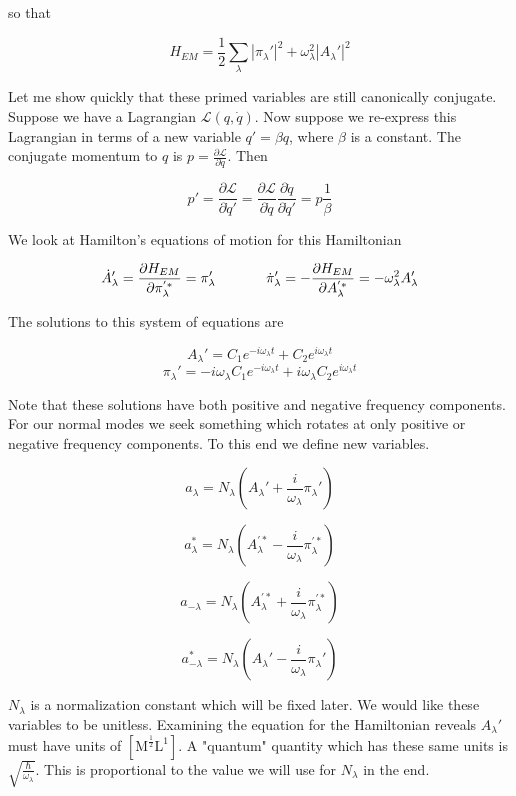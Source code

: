 \documentclass[12pt]{article}
\newcommand{\pardiv}[2][]{\frac{\partial #1}{\partial #2}}
\begin{document}
so that

\[H_{EM} = \frac{1}{2} \sum_{\lambda} |\pi_{\lambda}'|^2 +\omega_\lambda^2|A_{\lambda}'|^2 \]

Let me show quickly that these primed variables are still canonically conjugate. Suppose we have a Lagrangian $\mathcal{L}(q,\dot{q})$. Now suppose we re-express this Lagrangian in terms of a new variable $q' = \beta q$, where $\beta$ is a constant. The conjugate momentum to $q$ is $p = \pardiv[\mathcal{L}]{\dot{q}}$. Then

\[p' = \pardiv[\mathcal{L}]{\dot{q}'} = \pardiv[\mathcal{L}]{\dot{q}} \pardiv[\dot{q}]{\dot{q}'} = p \frac{1}{\beta} \]





We look at Hamilton's equations of motion for this Hamiltonian

\[\dot{A}_{\lambda}' = \pardiv[H_{EM}]{\pi_{\lambda}^{'*}} = \pi_{\lambda}' 
\hspace{.5 in}
\dot{\pi}_{\lambda}' = -\pardiv[H_{EM}]{A_{\lambda}^{'*}} = -\omega_\lambda^2 A_{\lambda}'  \]

The solutions to this system of equations are

\[A_{\lambda}' = C_1 e^{-i\omega_\lambda t} + C_2 e^{i \omega_{\lambda} t} \]
\[\pi_{\lambda}' = -i\omega_{\lambda} C_1 e^{-i\omega_{\lambda} t} +i\omega_{\lambda}C_2 e^{i\omega_{\lambda} t} \]

Note that these solutions have both positive and negative frequency components.
For our normal modes we seek something which rotates at only positive or negative frequency components.
To this end we define new variables.

\[a_{\lambda} = N_{\lambda}\left(A_\lambda' + \frac{i}{\omega_{\lambda}} \pi_{\lambda}'\right) \]

\[a_{\lambda}^* = N_{\lambda}\left(A_\lambda^{'*} - \frac{i}{\omega_{\lambda}} \pi_{\lambda}^{'*}\right) \]

\[a_{-\lambda} = N_{\lambda}\left(A_\lambda^{'*} + \frac{i}{\omega_{\lambda}} \pi_{\lambda}^{'*}\right) \]

\[a_{-\lambda}^* = N_{\lambda}\left(A_\lambda' - \frac{i}{\omega_{\lambda}} \pi_{\lambda}'\right) \]

$N_{\lambda}$ is a normalization constant which will be fixed later. We would like these variables to be unitless. Examining the equation for the Hamiltonian reveals $A_{\lambda}'$ must have units of $[\text{M}^{\frac{1}{2}} \text{L}^1]$. A "quantum" quantity which has these same units is $\sqrt{\frac{\hbar}{\omega_{\lambda}}}$. This is proportional to the value we will use for $N_{\lambda}$ in the end. 
 
\end{document}
